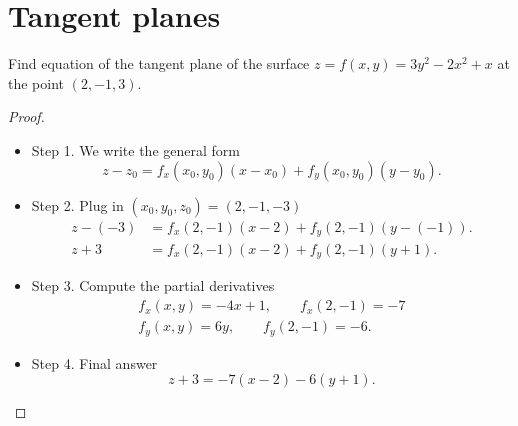 \section{Tangent planes}

\begin{example} Find equation of the tangent plane of the surface $z=f(x,y) = 3y^2-2x^2+x$ at the point $(2,-1,3)$.
\end{example}
\begin{proof} \quad 
\begin{itemize}
    \item Step 1. We write the general form
    \begin{equation*}
        z - z_0 = f_x(x_0,y_0)(x-x_0) + f_y(x_0,y_0)(y-y_0).
    \end{equation*}
    \item Step 2. Plug in $(x_0,y_0,z_0) = (2,-1,-3)$
    \begin{align*}
         z - (-3) &= f_x(2,-1)(x-2) + f_y(2,-1)(y-(-1)).  \\
         z + 3 &= f_x(2,-1)(x-2) + f_y(2,-1)(y+1). 
    \end{align*}
    \item Step 3. Compute the partial derivatives
    \begin{align*}
        f_x(x,y) = -4x+1, \qquad f_x(2,-1) = -7\\
        f_y(x,y) = 6y, \qquad f_y(2,-1) = -6.
    \end{align*}
    \item Step 4. Final answer
    \begin{equation*}
        z + 3 = -7(x-2) - 6 (y+1).
    \end{equation*}
\end{itemize}
\end{proof}
\clearpage 

